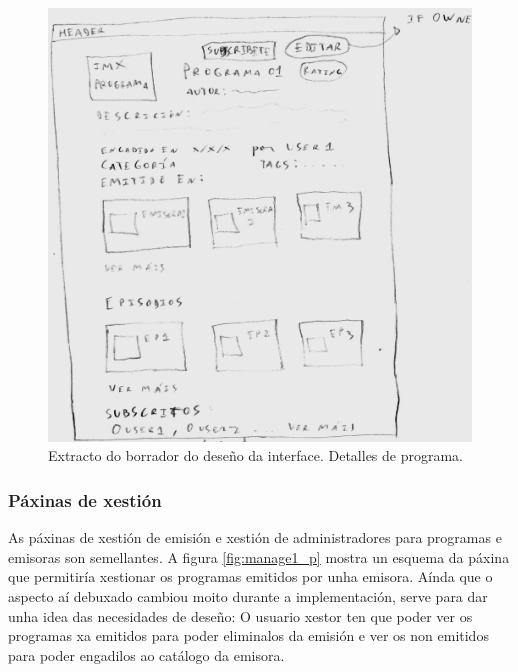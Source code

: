 \begin{figure}[H]
	\centering
	\includegraphics[scale=0.2,keepaspectratio=true]{./images/program1_p.png}
	\caption{Extracto do borrador do deseño da interface. Detalles de programa.}
	\label{fig:program1_p}
\end{figure}


\subsubsection{Páxinas de xestión}

As páxinas de xestión de emisión e xestión de administradores para programas e emisoras son semellantes. A figura \ref{fig:manage1_p} mostra un esquema da páxina que permitiría xestionar os programas emitidos por unha emisora. Aínda que o aspecto aí debuxado cambiou moito durante a implementación, serve para dar unha idea das necesidades de deseño: O usuario xestor ten que poder ver os programas xa emitidos para poder eliminalos da emisión e ver os non emitidos para poder engadilos ao catálogo da emisora.


